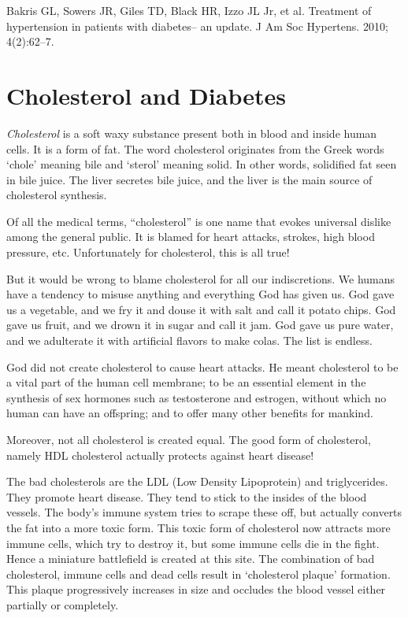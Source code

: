 {\begin{thebibliography}{99}
  Bakris GL, Sowers JR, Giles TD, Black HR, Izzo JL Jr, et al. Treatment of hypertension in patients with diabetes– an update. J Am Soc Hypertens. 2010; 4(2):62–7.

 \end{thebibliography}


\chapter{Cholesterol and Diabetes}\label{chap13B}

\textit{Cholesterol} is a soft waxy substance present both in blood and inside human cells. It is a form of fat. The word cholesterol originates from the Greek words ‘chole’ meaning bile and ‘sterol’ meaning solid. In other words, solidified fat seen in bile juice. The liver secretes bile juice, and the liver is the main source of cholesterol synthesis.

Of all the medical terms, “cholesterol” is one name that evokes universal dislike among the general public. It is blamed for heart attacks, strokes, high blood pressure, etc. Unfortunately for cholesterol, this is all true!

But it would be wrong to blame cholesterol for all our indiscretions. We humans have a tendency to misuse anything and everything God has given us. God gave us a vegetable, and we fry it and douse it with salt and call it potato chips. God gave us fruit, and we drown it in sugar and call it jam. God gave us pure water, and we adulterate it with artificial flavors to make colas. The list is endless.

God did not create cholesterol to cause heart attacks. He meant cholesterol to be a vital part of the human cell membrane; to be an essential element in the synthesis of sex hormones such as testosterone and estrogen, without which no human can have an offspring; and to offer many other benefits for mankind.

Moreover, not all cholesterol is created equal. The good form of cholesterol, namely HDL cholesterol actually protects against heart disease!

The bad cholesterols are the LDL (Low Density Lipoprotein) and triglycerides. They promote heart disease. They tend to stick to the insides of the blood vessels. The body’s immune system tries to scrape these off, but actually converts the fat into a more toxic form. This toxic form of cholesterol now attracts more immune cells, which try to destroy it, but some immune cells die in the fight. Hence a miniature battlefield is created at this site. The combination of bad cholesterol, immune cells and dead cells result in ‘cholesterol plaque’ formation. This plaque progressively increases in size and occludes the blood vessel either partially or completely.

}
